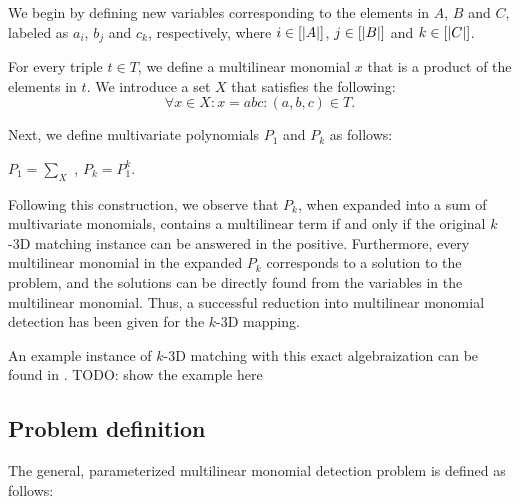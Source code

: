 We begin by defining new variables corresponding to the elements in $A$, $B$ and $C$, 
labeled as $a_i$, $b_j$ and $c_k$, respectively, where $i\in [{\left\vert A\right\vert}]$, $j\in
[{\left\vert B\right\vert}]$ and $k\in [{\left\vert C\right\vert}]$. 

For every triple $t \in T$, we define a multilinear monomial $x$ that is a
product of the elements in $t$. 
We introduce a set $X$ that satisfies the following:
\[
\forall x \in X: x = abc : (a, b, c) \in T.
\]

Next, we define multivariate polynomials $P_1$ and $P_k$ as follows:
\begin{center}$P_1 = \displaystyle \sum_{X}$ ,   $P_k = P_1^k$.\end{center}

Following this construction, we observe that $P_k$, when expanded into a sum of multivariate monomials, 
contains a multilinear term if and only if the original $k$-3D matching instance can be answered in the positive. 
Furthermore, every multilinear monomial in the expanded $P_k$ corresponds to a solution to the problem, and 
the solutions can be directly found from the variables in the multilinear monomial. Thus, 
a successful reduction into multilinear monomial detection has been given for the $k$-3D mapping.

An example instance of $k$-3D matching with this exact algebraization can be found in \cite{KouWil15}. 
TODO: show the example here


\subsection{Problem definition}

The general, parameterized multilinear monomial detection problem is defined as follows: 

\begin{problem}
\end{problem}

